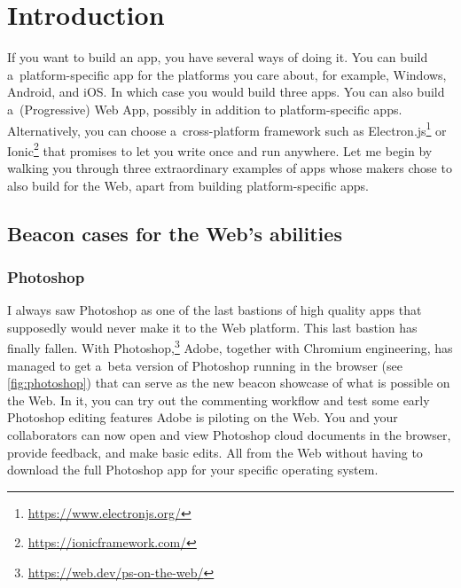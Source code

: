 \documentclass[sigconf]{acmart}
\begin{document}

\maketitle

\section{Introduction}

If you want to build an app, you have several ways of doing it. You can build a~platform-specific app for the platforms you care about, for example, Windows, Android, and iOS. In which case you would build three apps. You can also build a~(Progressive) Web App, possibly in addition to platform-specific apps. Alternatively, you can choose a~cross-platform framework such as Electron.js\footnote{\url{https://www.electronjs.org/}} or Ionic\footnote{\url{https://ionicframework.com/}} that promises to let you write once and run anywhere. Let me begin by walking you through three extraordinary examples of apps whose makers chose to also build for the Web, apart from building platform-specific apps.

\subsection{Beacon cases for the Web's abilities}

\subsubsection{Photoshop}

I always saw Photoshop as one of the last bastions of high quality apps that supposedly would never make it to the Web platform. This last bastion has finally fallen. With Photoshop,\footnote{\url{https://web.dev/ps-on-the-web/}} Adobe, together with Chromium engineering, has managed to get a~beta version of Photoshop running in the browser (see \autoref{fig:photoshop}) that can serve as the new beacon showcase of what is possible on the Web. In it, you can try out the commenting workflow and test some early Photoshop editing features Adobe is piloting on the Web. You and your collaborators can now open and view Photoshop cloud documents in the browser, provide feedback, and make basic edits. All from the Web without having to download the full Photoshop app for your specific operating system.
\end{document}
